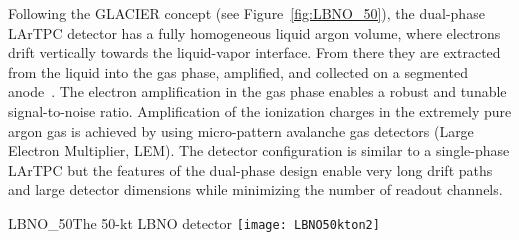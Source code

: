 
Following the GLACIER concept  (see Figure~\ref{fig:LBNO_50}), the dual-phase LArTPC detector has a fully homogeneous liquid argon volume, where electrons drift vertically towards the liquid-vapor interface. From there they are extracted from the liquid into the gas phase, amplified, and collected on a segmented  anode~\cite{Badertscher:2013wm,Badertscher:2012dq,Badertscher:2010zg}. The electron amplification in the gas phase %
enables a robust and tunable signal-to-noise ratio. Amplification of the ionization charges in the extremely pure argon gas is achieved by using micro-pattern avalanche gas detectors (Large Electron Multiplier, LEM). The detector configuration is similar to a single-phase LArTPC but %
the features of the dual-phase design enable very long drift paths and large detector dimensions while minimizing the number of readout channels.

\begin{cdrfigure}{LBNO_50}{The 50-kt LBNO detector}
\texttt{[image: LBNO50kton2]}
\end{cdrfigure}

